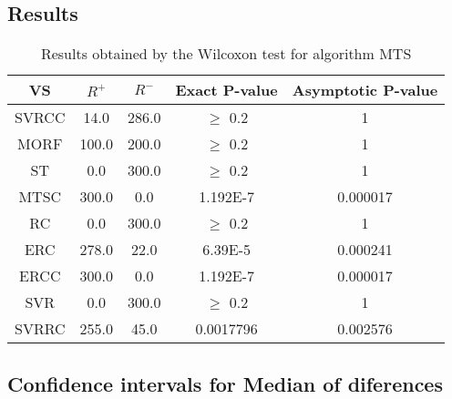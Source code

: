 \documentclass[a4paper,10pt]{article}
\begin{document}
\subsection{Results}

\begin{table}[!htp]
\centering\small
\begin{tabular}{
|c|c|c|c|c|}
\hline
 VS & $R^{+}$ & $R^{-}$ & Exact P-value & Asymptotic P-value \\ \hline 
SVRCC & 14.0 & 286.0 & $\geq$ 0.2 & 1\\ \hline 
MORF & 100.0 & 200.0 & $\geq$ 0.2 & 1\\ \hline 
ST & 0.0 & 300.0 & $\geq$ 0.2 & 1\\ \hline 
MTSC & 300.0 & 0.0 & 1.192E-7 & 0.000017\\ \hline 
RC & 0.0 & 300.0 & $\geq$ 0.2 & 1\\ \hline 
ERC & 278.0 & 22.0 & 6.39E-5 & 0.000241\\ \hline 
ERCC & 300.0 & 0.0 & 1.192E-7 & 0.000017\\ \hline 
SVR & 0.0 & 300.0 & $\geq$ 0.2 & 1\\ \hline 
SVRRC & 255.0 & 45.0 & 0.0017796 & 0.002576\\ \hline 

\end{tabular}
\caption{Results obtained by the Wilcoxon test for algorithm MTS}
\end{table}

\subsection{Confidence intervals for Median of diferences}
\end{document}
